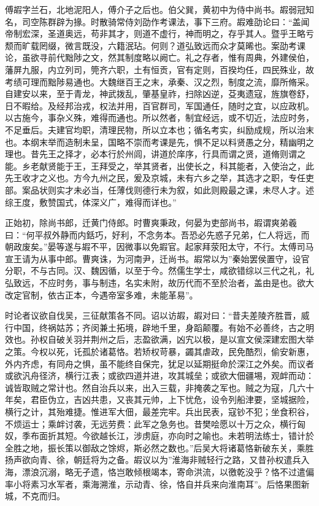 \documentclass[12pt,UTF8]{ctexbook}
\begin{document}
傅嘏字兰石，北地泥阳人，傅介子之后也。伯父巽，黄初中为侍中尚书。嘏弱冠知名，司空陈群辟为掾。时散骑常侍刘劭作考课法，事下三府。嘏难劭论曰：“盖闻帝制宏深，圣道奥远，苟非其才，则道不虚行，神而明之，存乎其人。暨乎王略亏颓而旷载罔缀，微言既没，六籍泯玷。何则？道弘致远而众才莫晞也。案劭考课论，虽欲寻前代黜陟之文，然其制度略以阙亡。礼之存者，惟有周典，外建侯伯，藩屏九服，内立列司，筦齐六职，土有恒贡，官有定则，百揆均任，四民殊业，故考绩可理而黜陟易通也。大魏继百王之末，承秦、汉之烈，制度之流，靡所脩采。自建安以来，至于青龙，神武拨乱，肇基皇祚，扫除凶逆，芟夷遗寇，旌旗卷舒，日不暇给。及经邦治戎，权法并用，百官群司，军国通任，随时之宜，以应政机。以古施今，事杂义殊，难得而通也。所以然者，制宜经远，或不切近，法应时务，不足垂后。夫建官均职，清理民物，所以立本也；循名考实，纠励成规，所以治末也。本纲末举而造制未呈，国略不崇而考课是先，惧不足以料贤愚之分，精幽明之理也。昔先王之择才，必本行於州闾，讲道於庠序，行具而谓之贤，道脩则谓之能。乡老献贤能于王，王拜受之，举其贤者，出使长之，科其能者，入使治之，此先王收才之义也。方今九州之民，爰及京城，未有六乡之举，其选才之职，专任吏部。案品状则实才未必当，任薄伐则德行未为叙，如此则殿最之课，未尽人才。述综王度，敷赞国式，体深义广，难得而详也。”

正始初，除尚书郎，迁黄门侍郎。时曹爽秉政，何晏为吏部尚书，嘏谓爽弟羲曰：“何平叔外静而内銛巧，好利，不念务本。吾恐必先惑子兄弟，仁人将远，而朝政废矣。”晏等遂与嘏不平，因微事以免嘏官。起家拜荥阳太守，不行。太傅司马宣王请为从事中郎。曹爽诛，为河南尹，迁尚书。嘏常以为”秦始罢侯置守，设官分职，不与古同。汉、魏因循，以至于今。然儒生学士，咸欲错综以三代之礼，礼弘致远，不应时务，事与制违，名实未附，故历代而不至於治者，盖由是也。欲大改定官制，依古正本，今遇帝室多难，未能革易”。

时论者议欲自伐吴，三征献策各不同。诏以访嘏，嘏对曰：“昔夫差陵齐胜晋，威行中国，终祸姑苏；齐闵兼土拓境，辟地千里，身蹈颠覆。有始不必善终，古之明效也。孙权自破关羽并荆州之后，志盈欲满，凶宄以极，是以宣文侯深建宏图大举之策。今权以死，讬孤於诸葛恪。若矫权苛暴，蠲其虐政，民免酷烈，偷安新惠，外内齐虑，有同舟之惧，虽不能终自保完，犹足以延期挺命於深江之外矣。而议者或欲汎舟径济，横行江表；或欲四道并进，攻其城垒；或欲大佃疆埸，观衅而动：诚皆取贼之常计也。然自治兵以来，出入三载，非掩袭之军也。贼之为寇，几六十年矣，君臣伪立，吉凶共患，又丧其元帅，上下忧危，设令列船津要，坚城据险，横行之计，其殆难捷。惟进军大佃，最差完牢。兵出民表，寇钞不犯；坐食积谷，不烦运士；乘衅讨袭，无远劳费：此军之急务也。昔樊哙愿以十万之众，横行匈奴，季布面折其短。今欲越长江，涉虏庭，亦向时之喻也。未若明法练士，错计於全胜之地，振长策以御敌之馀烬，斯必然之数也。”后吴大将诸葛恪新破东关，乘胜扬声欲向青、徐，朝廷将为之备。嘏议以为”淮海非贼轻行之路，又昔孙权遣兵入海，漂浪沉溺，略无孑遗，恪岂敢倾根竭本，寄命洪流，以徼乾没乎？恪不过遣偏率小将素习水军者，乘海溯淮，示动青、徐，恪自并兵来向淮南耳”。后恪果图新城，不克而归。
\end{document}
